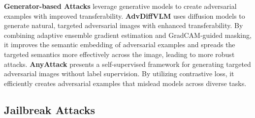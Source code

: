 \textbf{Generator-based Attacks} leverage generative models to create adversarial examples with improved transferability. \textbf{AdvDiffVLM} \cite{guo2024efficiently} uses diffusion models to generate natural, targeted adversarial images with enhanced transferability. By combining adaptive ensemble gradient estimation and GradCAM-guided masking, it improves the semantic embedding of adversarial examples and spreads the targeted semantics more effectively across the image, leading to more robust attacks. \textbf{AnyAttack} \cite{zhang2024anyattack} presents a self-supervised framework for generating targeted adversarial images without label supervision. By utilizing contrastive loss, it efficiently creates adversarial examples that mislead models across diverse tasks.




\subsection{Jailbreak Attacks}
\label{sec:vlm-jailbreak}

